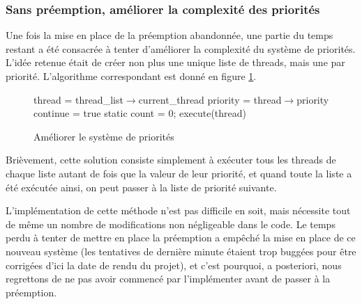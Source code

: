 \documentclass[a4paper,11pt]{article}
\begin{document}
\subsubsection*{Sans préemption, améliorer la complexité des priorités}

Une fois la mise en place de la préemption abandonnée, une partie du temps restant a été consacrée à tenter d'améliorer la complexité du système de priorités. L'idée retenue était de créer non plus une unique liste de threads, mais une par priorité. L'algorithme correspondant est donné en figure \ref{priority3}.

\begin{figure}[H]
\begin{algorithm}[H]
 thread = thread\_list$\rightarrow$current\_thread\;
 priority = thread$\rightarrow$priority\;
 continue = true\;
 static count = 0;
 \BlankLine
 execute(thread)\;
\end{algorithm}
\caption{Améliorer le système de priorités}
\label{priority3}
\end{figure}

Brièvement, cette solution consiste simplement à exécuter tous les threads de chaque liste autant de fois que la valeur de leur priorité, et quand toute la liste a été exécutée ainsi, on peut passer à la liste de priorité suivante.

L'implémentation de cette méthode n'est pas difficile en soit, mais nécessite tout de même un nombre de modifications non négligeable dans le code. Le temps perdu à tenter de mettre en place la préemption a empêché la mise en place de ce nouveau système (les tentatives de dernière minute étaient trop buggées pour être corrigées d'ici la date de rendu du projet), et c'est pourquoi, a posteriori, nous regrettons de ne pas avoir commencé par l'implémenter avant de passer à la préemption.
\end{document}
